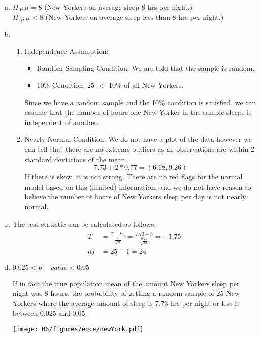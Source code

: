 {
\begin{enumerate}[(a)]
\setlength{\itemsep}{0mm}

\item $H_0: \mu = 8$ (New Yorkers on average sleep 8 hrs per night.) \\
$H_A: \mu < 8$ (New Yorkers on average sleep less than 8 hrs per night.)

\item 
\begin{enumerate}[1.]
\item Independence Assumption: 
\begin{itemize}
\item Random Sampling Condition: We are told that the sample is random.
\item 10\% Condition: 25 $<$ 10\% of all New Yorkers.
\end{itemize}
Since we have a random sample and the 10\% condition is satisfied, we can assume that the number of hours one New Yorker in the sample sleeps is independent of another.
\item Nearly Normal Condition: We do not have a plot of the data however we can tell that there are no extreme outliers as all observations are within 2 standard deviations of the mean.
\[ 7.73 \pm 2 * 0.77 = (6.18, 9.26) \]
If there is skew, it is not strong. There are no red flags for the normal model based on this (limited) information, and we do not have reason to believe the number of hours of New Yorkers sleep per day is not nearly normal. 
\end{enumerate}

\item The test statistic can be calculated as follows.
\begin{align*}
T &= \frac{\bar{x} - \mu_0}{\frac{s}{\sqrt{n}}} = \frac{7.73 - 8}{\frac{0.77}{\sqrt{25}}} = -1.75\\
df &= 25 - 1 = 24
\end{align*}

\item $0.025 < p-value < 0.05$

\begin{minipage}[c]{0.5\textwidth}
If in fact the true population mean of the amount New Yorkers sleep per night was 8 hours, the probability of getting a random sample of 25 New Yorkers where the average amount of sleep is 7.73 hrs per night or less is between 0.025 and 0.05.
\end{minipage}
\begin{minipage}[c]{0.5\textwidth}
\begin{center}
\texttt{[image: 06/figures/eoce/newYork.pdf]}
\end{center}
\end{minipage}



\end{enumerate}}
